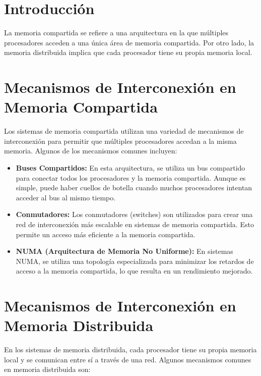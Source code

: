 \section{Introducción}
La memoria compartida se refiere a una arquitectura en la que múltiples procesadores acceden a una única área de memoria compartida. Por otro lado, la memoria distribuida implica que cada procesador tiene su propia memoria local.

\section{Mecanismos de Interconexión en Memoria Compartida}
Los sistemas de memoria compartida utilizan una variedad de mecanismos de interconexión para permitir que múltiples procesadores accedan a la misma memoria. Algunos de los mecanismos comunes incluyen:

\begin{itemize}
    \item \textbf{Buses Compartidos:} En esta arquitectura, se utiliza un bus compartido para conectar todos los procesadores y la memoria compartida. Aunque es simple, puede haber cuellos de botella cuando muchos procesadores intentan acceder al bus al mismo tiempo.
    
    \item \textbf{Conmutadores:} Los conmutadores (switches) son utilizados para crear una red de interconexión más escalable en sistemas de memoria compartida. Esto permite un acceso más eficiente a la memoria compartida.
    
    \item \textbf{NUMA (Arquitectura de Memoria No Uniforme):} En sistemas NUMA, se utiliza una topología especializada para minimizar los retardos de acceso a la memoria compartida, lo que resulta en un rendimiento mejorado.
\end{itemize}

\section{Mecanismos de Interconexión en Memoria Distribuida}
En los sistemas de memoria distribuida, cada procesador tiene su propia memoria local y se comunican entre sí a través de una red. Algunos mecanismos comunes en memoria distribuida son:

